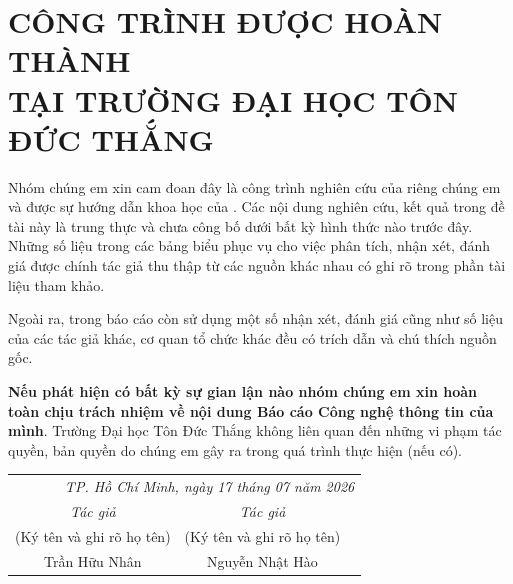 \section*{ CÔNG TRÌNH ĐƯỢC HOÀN THÀNH\\TẠI TRƯỜNG ĐẠI HỌC TÔN ĐỨC THẮNG}

	Nhóm chúng em xin cam đoan đây là công trình nghiên cứu của riêng chúng em và được sự hướng dẫn khoa học của \hl{\mbox{\gvhd}}. Các nội dung nghiên cứu, kết quả trong đề tài này là trung thực và chưa công bố dưới bất kỳ hình thức nào trước đây. Những số liệu trong các bảng biểu phục vụ cho việc phân tích, nhận xét, đánh giá được chính tác giả thu thập từ các nguồn khác nhau có ghi rõ trong phần tài liệu tham khảo.
 
	Ngoài ra, trong báo cáo còn sử dụng một số nhận xét, đánh giá cũng như số liệu của các tác giả khác, cơ quan tổ chức khác đều có trích dẫn và chú thích nguồn gốc.
 
	\textbf{Nếu phát hiện có bất kỳ sự gian lận nào nhóm chúng em xin hoàn toàn chịu trách nhiệm về nội dung Báo cáo Công nghệ thông tin của mình}. Trường Đại học Tôn Đức Thắng không liên quan đến những vi phạm tác quyền, bản quyền do chúng em gây ra trong quá trình thực hiện (nếu có).
    
\begin{flushright}
    \begin{tabular}{ccc}
        \multicolumn{3}{r}{\textit{TP. Hồ Chí Minh, ngày 17 tháng 07 năm 2026}} \\
        \noalign{\vspace{0.5cm}} %
         \textit{Tác giả} & \textit{Tác giả} \\
        (Ký tên và ghi rõ họ tên) & (Ký tên và ghi rõ họ tên) \\
        \noalign{\vspace{2cm}}
        Trần Hữu Nhân & Nguyễn Nhật Hào \\
    \end{tabular}
    \end{flushright}
\newpage

